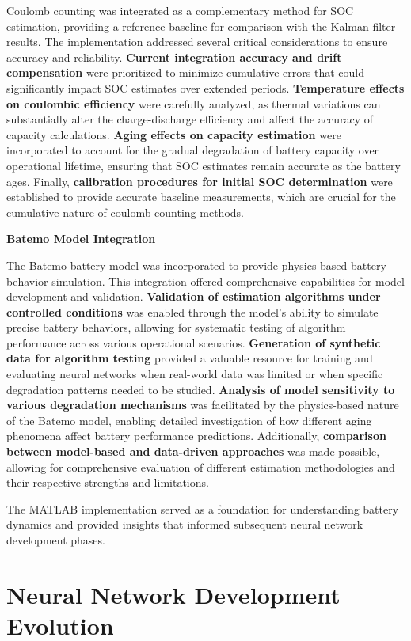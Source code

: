 Coulomb counting was integrated as a complementary method for SOC estimation, providing a reference baseline for comparison with the Kalman filter results. The implementation addressed several critical considerations to ensure accuracy and reliability. \textbf{Current integration accuracy and drift compensation} were prioritized to minimize cumulative errors that could significantly impact SOC estimates over extended periods. \textbf{Temperature effects on coulombic efficiency} were carefully analyzed, as thermal variations can substantially alter the charge-discharge efficiency and affect the accuracy of capacity calculations. \textbf{Aging effects on capacity estimation} were incorporated to account for the gradual degradation of battery capacity over operational lifetime, ensuring that SOC estimates remain accurate as the battery ages. Finally, \textbf{calibration procedures for initial SOC determination} were established to provide accurate baseline measurements, which are crucial for the cumulative nature of coulomb counting methods.

\textbf{Batemo Model Integration}

The Batemo battery model was incorporated to provide physics-based battery behavior simulation. This integration offered comprehensive capabilities for model development and validation. \textbf{Validation of estimation algorithms under controlled conditions} was enabled through the model's ability to simulate precise battery behaviors, allowing for systematic testing of algorithm performance across various operational scenarios. \textbf{Generation of synthetic data for algorithm testing} provided a valuable resource for training and evaluating neural networks when real-world data was limited or when specific degradation patterns needed to be studied. \textbf{Analysis of model sensitivity to various degradation mechanisms} was facilitated by the physics-based nature of the Batemo model, enabling detailed investigation of how different aging phenomena affect battery performance predictions. Additionally, \textbf{comparison between model-based and data-driven approaches} was made possible, allowing for comprehensive evaluation of different estimation methodologies and their respective strengths and limitations.

The MATLAB implementation served as a foundation for understanding battery dynamics and provided insights that informed subsequent neural network development phases.

\section{Neural Network Development Evolution}

